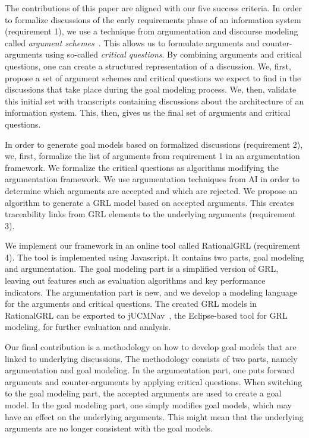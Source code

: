 The contributions of this paper are aligned with our five success criteria. In order to formalize discussions of the early requirements phase of an information system (requirement 1), we use a technique from argumentation and discourse modeling called \emph{argument schemes}~\cite{walton-etal2004}. This allows us to formulate arguments and counter-arguments using so-called \emph{critical questions}. By combining arguments and critical questions, one can create a structured representation of a discussion. We, first, propose a set of argument schemes and critical questions we expect to find in the discussions that take place during the goal modeling process. We, then, validate this initial set with transcripts containing discussions about the architecture of an information system. This, then, gives us the final set of arguments and critical questions.

In order to generate goal models based on formalized discussions (requirement 2), we, first, formalize the list of arguments from requirement 1 in an argumentation framework. We formalize the critical questions as algorithms modifying the argumentation framework. We use argumentation techniques from AI in order to determine which arguments are accepted and which are rejected. We propose an algorithm to generate a GRL model based on accepted arguments. This creates traceability links from GRL elements to the underlying arguments (requirement 3).

We implement our framework in an online tool called RationalGRL (requirement 4). The tool is implemented using Javascript. It contains  two parts, goal modeling and argumentation. The goal modeling part is a simplified version of GRL, leaving out features such as evaluation algorithms and key performance indicators. The argumentation part is new, and we develop a modeling language for the arguments and critical questions. The created GRL models in RationalGRL can be exported to jUCMNav~\cite{}, the Eclipse-based tool for GRL modeling, for further evaluation and analysis. 

Our final contribution is a methodology on how to develop goal models that are linked to underlying discussions. The methodology consists of two parts, namely argumentation and goal modeling. In the argumentation part, one puts forward arguments and counter-arguments by applying critical questions. When switching to the goal modeling part, the accepted arguments are used to create a goal model. In the goal modeling part, one simply modifies goal models, which may have an effect on the underlying arguments. This might mean that the underlying arguments are no longer consistent with the goal models.

